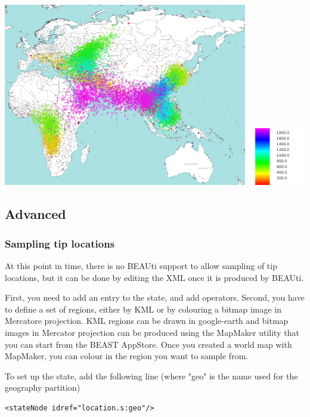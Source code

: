 \documentclass{article}
\begin{document}
\includegraphics[width=0.8\textwidth]{figures/heatmap}
\includegraphics[width=0.19\textwidth]{figures/legend}


\subsection*{Advanced}
\subsubsection*{Sampling tip locations}
At this point in time, there is no BEAUti support to allow sampling of tip locations, but it can be done by editing the XML once it is produced by BEAUti.




First, you need to add an entry to the state, and add operators.
Second, you have to define a set of regions, either by KML or by colouring a bitmap image in Mercatore projection. KML regions can be drawn in google-earth and bitmap images in Mercator projection can be produced using the MapMaker utility that you can start from the BEAST AppStore. Once you created a world map with MapMaker, you can colour in the region you want to sample from.

To set up the state, add the following line (where "geo" is the name used for the geography partition)

\begin{verbatim}
<stateNode idref="location.s:geo"/>
\end{verbatim}
\end{document}

